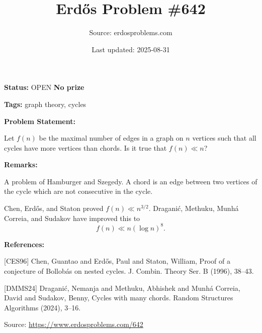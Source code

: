 \documentclass{article}
\title{Erd\H{o}s Problem \#642}
\date{Last updated: 2025-08-31}
\author{Source: erdosproblems.com}
\begin{document}
\maketitle

\noindent\textbf{Status:} OPEN \quad \textbf{No prize}

\noindent\textbf{Tags:} graph theory, cycles

\medskip
\noindent\textbf{Problem Statement:}

Let $f(n)$ be the maximal number of edges in a graph on $n$ vertices such that all cycles have more vertices than chords. Is it true that $f(n)\ll n$?

\bigskip
\noindent\textbf{Remarks:}

A problem of Hamburger and Szegedy. A chord is an edge between two vertices of the cycle which are not consecutive in the cycle.

Chen, Erd\H{o}s, and Staton \cite{CES96} proved $f(n) \ll n^{3/2}$. Dragani\'{c}, Methuku, Munh\'{a} Correia, and Sudakov \cite{DMMS24} have improved this to\[f(n) \ll n(\log n)^8.\]

\bigskip
\noindent\textbf{References:}

[CES96] Chen, Guantao and Erd\H{o}s, Paul and Staton, William, Proof of a conjecture of {B}ollob\'{a}s on nested cycles. J. Combin. Theory Ser. B (1996), 38--43.
 
 [DMMS24] Dragani\'c, Nemanja and Methuku, Abhishek and Munh\'{a}{}
Correia, David and Sudakov, Benny, Cycles with many chords. Random Structures Algorithms (2024), 3--16.

\bigskip
\noindent\small{Source: \url{https://www.erdosproblems.com/642}}
\end{document}
